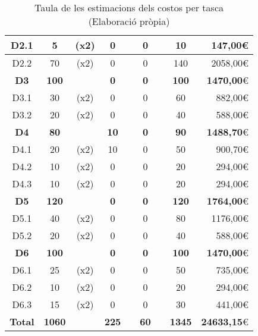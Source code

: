 \begin{table}[H]
\begin{tabular}{|c|cc|cc|cc|c|r|}
    D2.1	&	5	&	{\footnotesize	(x2)}	&	0	&	&	0	&	&	10	&	147,00\euro	\\	\hline
    D2.2	&	70	&	{\footnotesize	(x2)}	&	0	&	&	0	&	&	140	&	2058,00\euro	\\	\hline
    \textbf{D3}	&	\textbf{100}	&	&	\textbf{0}	&	&	\textbf{0}	&	&	\textbf{100}	&	\textbf{1470,00}\euro	\\	\hline
    D3.1	&	30	&	{\footnotesize	(x2)}	&	0	&	&	0	&	&	60	&	882,00\euro	\\	\hline
    D3.2	&	20	&	{\footnotesize	(x2)}	&	0	&	&	0	&	&	40	&	588,00\euro	\\	\hline
    \textbf{D4}	&	\textbf{80}	&	&	\textbf{10}	&	&	\textbf{0}	&	&	\textbf{90}	&	\textbf{1488,70}\euro	\\	\hline
    D4.1	&	20	&	{\footnotesize	(x2)}	&	10	&	&	0	&	&	50	&	900,70\euro	\\	\hline
    D4.2	&	10	&	{\footnotesize	(x2)}	&	0	&	&	0	&	&	20	&	294,00\euro	\\	\hline
    D4.3	&	10	&	{\footnotesize	(x2)}	&	0	&	&	0	&	&	20	&	294,00\euro	\\	\hline
    \textbf{D5}	&	\textbf{120}	&	&	\textbf{0}	&	&	\textbf{0}	&	&	\textbf{120}	&	\textbf{1764,00}\euro	\\	\hline
    D5.1	&	40	&	{\footnotesize	(x2)}	&	0	&	&	0	&	&	80	&	1176,00\euro	\\	\hline
    D5.2	&	20	&	{\footnotesize	(x2)}	&	0	&	&	0	&	&	40	&	588,00\euro	\\	\hline
    \textbf{D6}	&	\textbf{100}	&	&	\textbf{0}	&	&	\textbf{0}	&	&	\textbf{100}	&	\textbf{1470,00}\euro	\\	\hline
    D6.1	&	25	&	{\footnotesize	(x2)}	&	0	&	&	0	&	&	50	&	735,00\euro	\\	\hline
    D6.2	&	10	&	{\footnotesize	(x2)}	&	0	&	&	0	&	&	20	&	294,00\euro	\\	\hline
    D6.3	&	15	&	{\footnotesize	(x2)}	&	0	&	&	0	&	&	30	&	441,00\euro	\\	\hline
    \textbf{Total}	&	\textbf{1060}	&	&	\textbf{225}	&	&	\textbf{60}	&	&	\textbf{1345}	&	\textbf{24633,15}\euro	\\	\hline
    \end{tabular}
    \caption[Costos per tasca]{Taula de les estimacions dels costos per tasca \\ (Elaboració pròpia)}
    \label{fig:costos_tasques}
\end{table}











